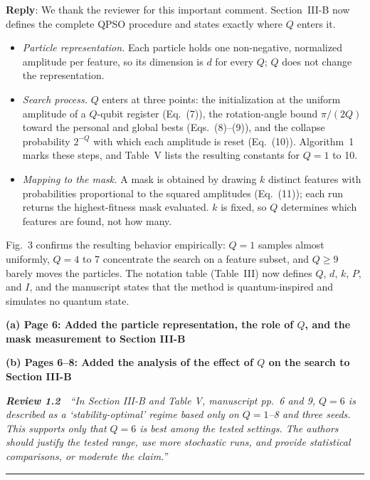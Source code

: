 \documentclass[11pt]{article}
\newcommand{\review}[2]{\par\bigskip\noindent\textbf{\textit{Review #1}}\ \ \textit{``#2''}\par\smallskip\hrule\medskip}
\newcommand{\reply}{\noindent\textbf{Reply}: }
\newcommand{\loc}[1]{\par\medskip\noindent\textbf{#1}\par}
\begin{document}
\reply We thank the reviewer for this important comment. Section~III-B now
defines the complete QPSO procedure and states exactly where $Q$ enters it.
\begin{itemize}[leftmargin=*,itemsep=1pt]
  \item \textit{Particle representation.} Each particle holds one
        non-negative, normalized amplitude per feature, so its dimension is
        $d$ for every $Q$; $Q$ does not change the representation.
  \item \textit{Search process.} $Q$ enters at three points: the
        initialization at the uniform amplitude of a $Q$-qubit register
        (Eq.~(7)), the rotation-angle bound $\pi/(2Q)$ toward the personal and
        global bests (Eqs.~(8)--(9)), and the collapse probability $2^{-Q}$
        with which each amplitude is reset (Eq.~(10)). Algorithm~1 marks these
        steps, and Table~V lists the resulting constants for $Q=1$ to 10.
  \item \textit{Mapping to the mask.} A mask is obtained by drawing $k$
        distinct features with probabilities proportional to the squared
        amplitudes (Eq.~(11)); each run returns the highest-fitness mask
        evaluated. $k$ is fixed, so $Q$ determines which features are found,
        not how many.
\end{itemize}
Fig.~3 confirms the resulting behavior empirically: $Q=1$ samples almost
uniformly, $Q=4$ to 7 concentrate the search on a feature subset, and
$Q\ge9$ barely moves the particles. The notation table (Table~III) now
defines $Q$, $d$, $k$, $P$, and $I$, and the manuscript states that the
method is quantum-inspired and simulates no quantum state.

\loc{(a) Page 6: Added the particle representation, the role of $Q$, and the mask measurement to Section III-B}

\loc{(b) Pages 6--8: Added the analysis of the effect of $Q$ on the search to Section III-B}

\review{1.2}{In Section III-B and Table V, manuscript pp.~6 and 9, $Q=6$ is described as a `stability-optimal' regime based only on $Q=1$--8 and three seeds. This supports only that $Q=6$ is best among the tested settings. The authors should justify the tested range, use more stochastic runs, and provide statistical comparisons, or moderate the claim.}
\end{document}
